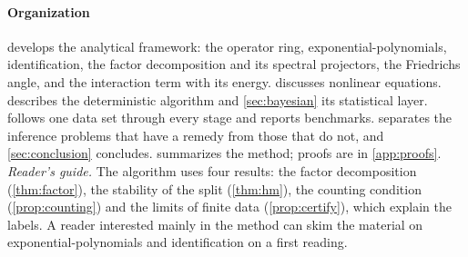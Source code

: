 \paragraph{Organization}  develops the analytical framework: the operator ring, exponential-polynomials,
identification, the factor decomposition and its spectral projectors, the Friedrichs angle, and the interaction term with
its energy.  discusses nonlinear equations.  describes the deterministic
algorithm and \cref{sec:bayesian} its statistical layer.  follows one data set through every stage and
reports benchmarks.  separates the inference problems that have a remedy from those that do not, and
\cref{sec:conclusion} concludes.  summarizes the method; proofs are in \cref{app:proofs}. \emph{Reader's guide.} The algorithm uses four results: the factor decomposition (\cref{thm:factor}), the
stability of the split (\cref{thm:hm}), the counting condition (\cref{prop:counting}) and the limits of finite data
(\cref{prop:certify}), which explain the labels. A reader interested mainly in the method can skim the material on
exponential-polynomials and identification on a first reading.


